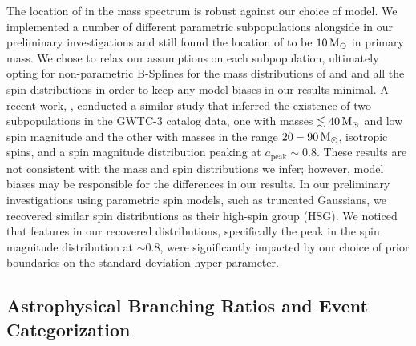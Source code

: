 The location of \first{} in the mass spectrum is robust against our choice of model. We implemented a number of different parametric subpopulations alongside \first{} in our preliminary investigations and still found the location of \first{} to be $10{\,\rm M}_\odot$ in primary mass. We chose to relax our assumptions on each subpopulation, ultimately opting for non-parametric B-Splines for the mass distributions of \contA{} and \contB{} and all the spin distributions in order to keep any model biases in our results minimal. A recent work, \citet{2303.02973}, conducted a similar study that inferred the existence of two subpopulations in the GWTC-3 catalog data, one with masses $\lesssim 40{\,\rm M}_\odot$ and low spin magnitude and the other with masses in the range $20-90{\,\rm M}_\odot$, isotropic spins, and a spin magnitude distribution peaking at $a_\text{peak} \sim 0.8$. These results are not consistent with the mass and spin distributions we infer; however, model biases may be responsible for the differences in our results. In our preliminary investigations using parametric spin models, such as truncated Gaussians, we recovered similar spin distributions as their high-spin group (HSG). We noticed that features in our recovered distributions, specifically the peak in the spin magnitude distribution at $\sim 0.8$, were significantly impacted by our choice of prior boundaries on the standard deviation hyper-parameter.

\subsection{Astrophysical Branching Ratios and Event Categorization}

